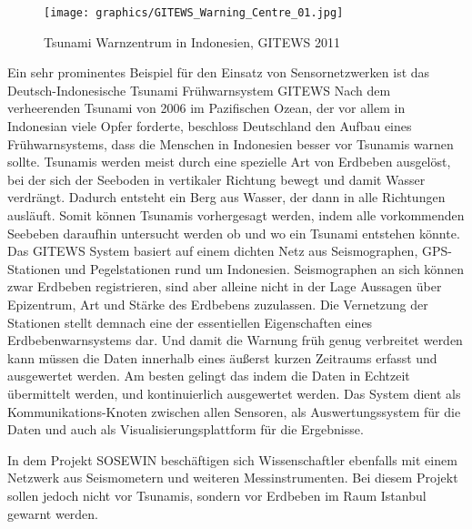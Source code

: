 \begin{figure}
  \begin{center}
 	 \texttt{[image: graphics/GITEWS\_Warning\_Centre\_01.jpg]} 
	\caption{Tsunami Warnzentrum in Indonesien, GITEWS 2011}
  \end{center}
\end{figure}
Ein sehr prominentes Beispiel für den Einsatz von Sensornetzwerken ist das Deutsch-Indonesische Tsunami Frühwarnsystem  \gls{GITEWS} Nach dem verheerenden Tsunami von 2006 im Pazifischen Ozean, der vor allem in Indonesian viele Opfer forderte, beschloss Deutschland den Aufbau eines Frühwarnsystems, dass die Menschen in Indonesien besser vor Tsunamis warnen sollte. 
Tsunamis werden meist durch eine spezielle Art von Erdbeben ausgelöst, bei der sich der Seeboden in vertikaler Richtung bewegt und damit Wasser verdrängt. Dadurch entsteht ein Berg aus Wasser, der dann in alle Richtungen ausläuft. Somit können Tsunamis vorhergesagt werden, indem alle vorkommenden Seebeben daraufhin untersucht werden ob und wo ein Tsunami entstehen könnte. Das \gls{GITEWS} System basiert auf einem dichten Netz aus Seismographen,  GPS-Stationen und Pegelstationen rund um Indonesien. Seismographen an sich können zwar Erdbeben registrieren, sind aber alleine nicht in der Lage Aussagen über Epizentrum, Art und Stärke des Erdbebens zuzulassen. Die Vernetzung der Stationen stellt demnach eine der essentiellen Eigenschaften eines Erdbebenwarnsystems dar. Und damit die Warnung früh genug verbreitet werden kann müssen die Daten innerhalb eines äußerst kurzen Zeitraums erfasst und ausgewertet werden. Am besten gelingt das indem die Daten in Echtzeit übermittelt werden, und kontinuierlich ausgewertet werden. Das System dient als Kommunikations-Knoten zwischen allen Sensoren, als Auswertungssystem für die Daten und auch als Visualisierungsplattform für die Ergebnisse. \citep{lauterjung_gitewstsunami-fruhwarnsystem_2011} \citep{strobl_geodatenmanagement_2007} \citep{spahn_experience_2010}

In dem Projekt \gls{SOSEWIN} beschäftigen sich Wissenschaftler ebenfalls mit einem Netzwerk aus Seismometern und weiteren Messinstrumenten. Bei diesem Projekt sollen jedoch nicht vor Tsunamis, sondern vor Erdbeben im Raum Istanbul gewarnt werden. 

